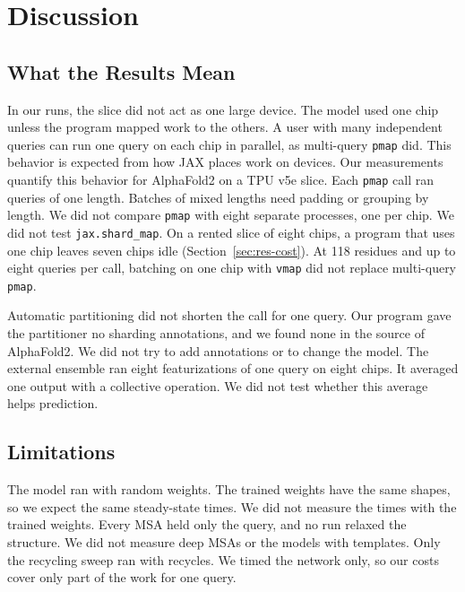 \section{Discussion}\label{sec:discussion}

\subsection{What the Results Mean}
In our runs, the slice did not act as one large device. The model used one chip unless the program mapped work to the
others. A user with many independent queries can run one query on each chip in parallel, as
multi-query \texttt{pmap} did. This behavior is expected from how JAX places work on devices. Our measurements quantify this behavior for
AlphaFold2 on a TPU v5e slice. Each \texttt{pmap} call ran queries of one length. Batches of mixed lengths need padding
or grouping by length. We did not compare \texttt{pmap} with eight separate processes, one per chip. We did not test
\texttt{jax.shard\_map}. On a rented slice of eight chips, a program that uses one chip leaves seven chips idle
(Section~\ref{sec:res-cost}).
At 118 residues and up to eight queries per call, batching on one chip with \texttt{vmap} did not replace multi-query \texttt{pmap}. %

Automatic partitioning did not shorten the call for one query. Our program gave the partitioner no sharding
annotations, and we found none in the source of AlphaFold2. We did not try to add annotations or to change the model.
The external ensemble ran eight featurizations of one query on eight chips. It averaged one output with a collective
operation. We did not test whether this average helps prediction.

\subsection{Limitations}\label{sec:limitations}
The model ran with random weights. The trained weights have the same shapes, so we expect the same steady-state times.
We did not measure the times with the trained weights. Every MSA held only the query, and no run relaxed the structure.
We did not measure deep MSAs or the models with templates. Only the recycling sweep ran with recycles. We timed the
network only, so our costs cover only part of the work for one query.

